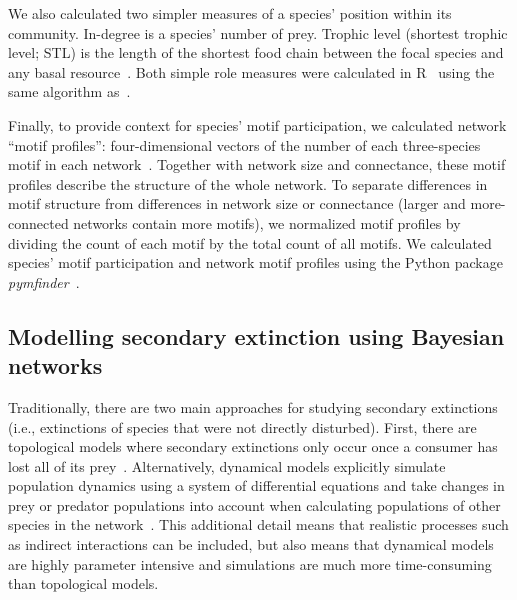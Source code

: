 \documentclass[12pt]{article}
\begin{document}
\begin{spacing}{2.0}
        We also calculated two simpler measures of a species' position within its community.
        In-degree is a species' number of prey.
        Trophic level (shortest trophic level; STL) is the length of the shortest food chain between the focal species and any basal resource~\citep{Williams2004}.
        Both simple role measures were calculated in R~\citep{R} using the same algorithm as~\citet{Eklof2013}.

        
        Finally, to provide context for species' motif participation, we calculated network ``motif profiles'': four-dimensional vectors of the number of each three-species motif in each network~\citep{Stouffer2012}.
        Together with network size and connectance, these motif profiles describe the structure of the whole network.
        To separate differences in motif structure from differences in network size or connectance (larger and more-connected networks contain more motifs), we normalized motif profiles by dividing the count of each motif by the total count of all motifs. 
        We calculated species' motif participation and network motif profiles using the Python package \emph{pymfinder}~\citep{pymfinder}.

    
    \subsection*{Modelling secondary extinction using Bayesian networks}


        Traditionally, there are two main approaches for studying secondary extinctions (i.e., extinctions of species that were not directly disturbed). 
        First, there are topological models where secondary extinctions only occur once a consumer has lost all of its prey~\citep{dunne2009cascading}. 
        Alternatively, dynamical models explicitly simulate population dynamics using a system of differential equations and take changes in prey or predator populations into account when calculating populations of other species in the network~\citep{binzer2011susceptibility}. 
        This additional detail means that realistic processes such as indirect interactions can be included, but also means that dynamical models are highly parameter intensive and simulations are much more time-consuming than topological models. 
        

\end{spacing}
\end{document}
